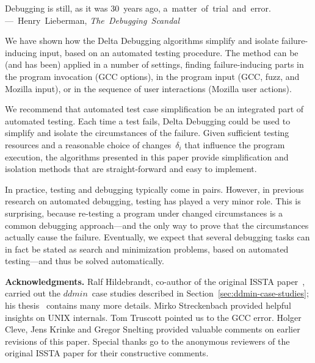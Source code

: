 \documentclass{acm_proc_article-sp}
\newcommand{\GCC}        {{\small GCC}\xspace}
\newcommand{\ISSTA}      {{\small ISSTA}\xspace}
\newcommand{\UNIX}       {{\small UNIX}\xspace}
\newcommand{\ddmin}{\textit{ddmin}\xspace}
\newenvironment{Quote}{%
\smallskip
\begin{minipage}[t]{\columnwidth}
\begin{flushright}%
\itshape%
\samepage%
}{\end{flushright}\end{minipage}\par}
\newcommand{\By}[2]{\\[1mm]---~\mbox{\textnormal{#1}} \mbox{\textsl{#2}}}
\theoremstyle{plain}
\begin{document}
\begin{Quote}
Debugging is still, as it was 30~years ago, a~matter~of~trial~and~error.
\By{Henry Lieberman,}{The Debugging Scandal}
\end{Quote}

\noindent
We have shown how the Delta Debugging algorithms simplify and isolate
failure-inducing input, based on an automated testing procedure.  The
method can be (and has been) applied in a number of settings, finding
failure-inducing parts in the program invocation (\GCC options), in
the program input (\GCC, fuzz, and Mozilla input), or in the sequence
of user interactions (Mozilla user actions).

We recommend that automated test case simplification be an integrated
part of automated testing.  Each time a test fails, Delta Debugging
could be used to simplify and isolate the circumstances of the
failure.  Given sufficient testing resources and a reasonable choice
of changes~$\delta_i$ that influence the program execution, the algorithms
presented in this paper provide simplification and isolation methods
that are straight-forward and easy to implement.

In practice, testing and debugging typically come in pairs.  However,
in previous research on automated debugging, testing has played a very
minor role.  This is surprising, because re-testing a program under
changed circumstances is a common debugging approach---and the only
way to prove that the circumstances actually cause the failure.
Eventually, we expect that several debugging tasks can in fact be
stated as search and minimization problems, based on automated
testing---and thus be solved automatically.

\noindent
\textbf{Acknowledgments.}  Ralf Hildebrandt, co-author of the
original \ISSTA paper~\cite{hildebrandt/zeller/2000/issta}, carried
out the $\ddmin$~case studies described in
Section~\ref{sec:ddmin-case-studies}; his
thesis~\cite{hildebrandt/2000/dipl} contains many more details.  Mirko
Streckenbach provided helpful insights on \UNIX internals.  Tom
Truscott pointed us to the \GCC error.  Holger Cleve, Jens Krinke and
Gregor Snelting provided valuable comments on earlier revisions of
this paper.  Special thanks go to the anonymous reviewers of the
original \ISSTA paper for their constructive comments.

\end{document}
